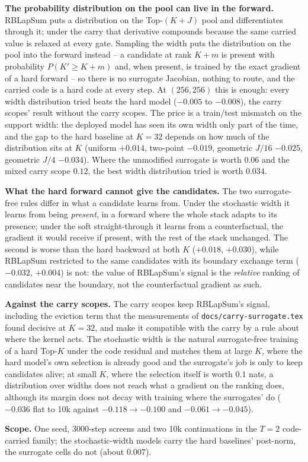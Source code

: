 \documentclass[10pt,a4paper]{article}
\newcommand{\code}[1]{\texttt{#1}}
\begin{document}
\textbf{The probability distribution on the pool can live in the forward.}  RBLapSum puts a distribution on the
Top-\((K{+}J)\) pool and differentiates through it; under the carry that derivative compounds because the same
carried value is relaxed at every gate.  Sampling the width puts the distribution on the pool into the forward
instead -- a candidate at rank \(K{+}m\) is present with probability \(P(K'\ge K{+}m)\) and, when present, is trained
by the exact gradient of a hard forward -- so there is no surrogate Jacobian, nothing to route, and the carried code
is a hard code at every step.  At \((256,256)\) this is enough: every width distribution tried beats the hard model
(\(-0.005\) to \(-0.008\)), the carry scopes' result without the carry scopes.  The price is a train/test mismatch
on the support width: the deployed model has seen its own width only part of the time, and the gap to the hard
baseline at \(K=32\) depends on how much of the distribution sits at \(K\) (uniform \(+0.014\), two-point
\(-0.019\), geometric \(J/16\) \(-0.025\), geometric \(J/4\) \(-0.034\)).  Where the unmodified surrogate is worth
\(0.06\) and the mixed carry scope \(0.12\), the best width distribution tried is worth \(0.034\).

\textbf{What the hard forward cannot give the candidates.}  The two surrogate-free rules differ in what a
candidate learns from.  Under the stochastic width it learns from being \emph{present}, in a forward where the
whole stack adapts to its presence; under the soft straight-through it learns from a counterfactual, the gradient
it would receive if present, with the rest of the stack unchanged.  The second is worse than the hard backward at
both \(K\) (\(+0.018\), \(+0.030\)), while RBLapSum restricted to the same candidates with its boundary exchange
term (\(-0.032\), \(+0.004\)) is not: the value of RBLapSum's signal is the \emph{relative} ranking of candidates
near the boundary, not the counterfactual gradient as such.

\textbf{Against the carry scopes.}  The carry scopes keep RBLapSum's signal, including the eviction term that the
measurements of \code{docs/carry-surrogate.tex} found decisive at \(K=32\), and make it compatible with the carry
by a rule about where the kernel acts.  The stochastic width is the natural surrogate-free training of a hard
Top-\(K\) under the code residual and matches them at large \(K\), where the hard model's own selection is already
good and the surrogate's job is only to keep candidates alive; at small \(K\), where the selection itself is
worth \(0.1\) nats, a distribution over widths does not reach what a gradient on the ranking does, although its
margin does not decay with training where the surrogates' do (\(-0.036\) flat to 10k against \(-0.118\to-0.100\)
and \(-0.061\to-0.045\)).

\textbf{Scope.}  One seed, 3000-step screens and two 10k continuations in the \(T=2\) code-carried family; the
stochastic-width models carry the hard baselines' post-norm, the surrogate cells do not (about \(0.007\)).
\end{document}
